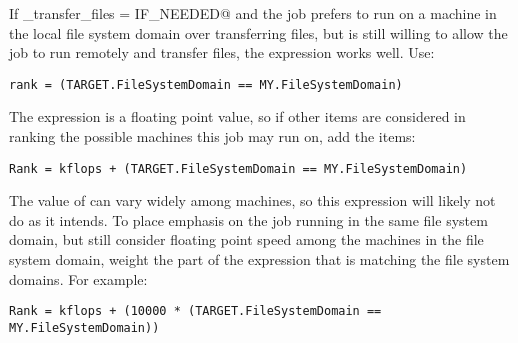 If \verb@should_transfer_files = IF_NEEDED@ and the job prefers
to run on a machine in the local file system domain
over transferring files,
but is still willing to allow the job to run remotely and transfer files,
the  expression works well.  Use:

\footnotesize
\begin{verbatim}
rank = (TARGET.FileSystemDomain == MY.FileSystemDomain)
\end{verbatim}
\normalsize

The  expression is a floating point value,
so if other items are considered in ranking the possible machines this job
may run on, add the items:

\footnotesize
\begin{verbatim}
Rank = kflops + (TARGET.FileSystemDomain == MY.FileSystemDomain)
\end{verbatim}
\normalsize

The value of  can vary widely among machines,
so this  expression will likely not do as it intends.
To place emphasis on the job running in the same file system domain,
but still consider floating point speed among the machines 
in the file system domain,
weight the part of the expression that is matching the file system domains.
For example: 

\footnotesize
\begin{verbatim}
Rank = kflops + (10000 * (TARGET.FileSystemDomain == MY.FileSystemDomain))
\end{verbatim}
\normalsize
